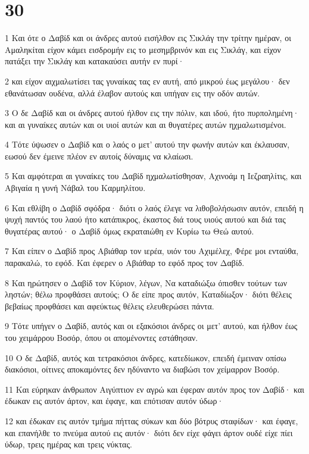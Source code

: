 \chapter{30}

\par 1 Και ότε ο Δαβίδ και οι άνδρες αυτού εισήλθον εις Σικλάγ την τρίτην ημέραν, οι Αμαληκίται είχον κάμει εισδρομήν εις το μεσημβρινόν και εις Σικλάγ, και είχον πατάξει την Σικλάγ και κατακαύσει αυτήν εν πυρί·
\par 2 και είχον αιχμαλωτίσει τας γυναίκας τας εν αυτή, από μικρού έως μεγάλου· δεν εθανάτωσαν ουδένα, αλλά έλαβον αυτούς και υπήγαν εις την οδόν αυτών.
\par 3 Ο δε Δαβίδ και οι άνδρες αυτού ήλθον εις την πόλιν, και ιδού, ήτο πυρπολημένη· και αι γυναίκες αυτών και οι υιοί αυτών και αι θυγατέρες αυτών ηχμαλωτισμένοι.
\par 4 Τότε ύψωσεν ο Δαβίδ και ο λαός ο μετ' αυτού την φωνήν αυτών και έκλαυσαν, εωσού δεν έμεινε πλέον εν αυτοίς δύναμις να κλαίωσι.
\par 5 Και αμφότεραι αι γυναίκες του Δαβίδ ηχμαλωτίσθησαν, Αχινοάμ η Ιεζραηλίτις, και Αβιγαία η γυνή Νάβαλ του Καρμηλίτου.
\par 6 Και εθλίβη ο Δαβίδ σφόδρα· διότι ο λαός έλεγε να λιθοβολήσωσιν αυτόν, επειδή η ψυχή παντός του λαού ήτο κατάπικρος, έκαστος διά τους υιούς αυτού και διά τας θυγατέρας αυτού· ο Δαβίδ όμως εκραταιώθη εν Κυρίω τω Θεώ αυτού.
\par 7 Και είπεν ο Δαβίδ προς Αβιάθαρ τον ιερέα, υιόν του Αχιμέλεχ, Φέρε μοι ενταύθα, παρακαλώ, το εφόδ. Και έφερεν ο Αβιάθαρ το εφόδ προς τον Δαβίδ.
\par 8 Και ηρώτησεν ο Δαβίδ τον Κύριον, λέγων, Να καταδιώξω όπισθεν τούτων των ληστών; θέλω προφθάσει αυτούς; Ο δε είπε προς αυτόν, Καταδίωξον· διότι θέλεις βεβαίως προφθάσει και αφεύκτως θέλεις ελευθερώσει πάντα.
\par 9 Τότε υπήγεν ο Δαβίδ, αυτός και οι εξακόσιοι άνδρες οι μετ' αυτού, και ήλθον έως του χειμάρρου Βοσόρ, όπου οι απομένοντες εστάθησαν.
\par 10 Ο δε Δαβίδ, αυτός και τετρακόσιοι άνδρες, κατεδίωκον, επειδή έμειναν οπίσω διακόσιοι, οίτινες αποκαμόντες δεν ηδύναντο να διαβώσι τον χείμαρρον Βοσόρ.
\par 11 Και εύρηκαν άνθρωπον Αιγύπτιον εν αγρώ και έφεραν αυτόν προς τον Δαβίδ· και έδωκαν εις αυτόν άρτον, και έφαγε, και επότισαν αυτόν ύδωρ·
\par 12 και έδωκαν εις αυτόν τμήμα πήττας σύκων και δύο βότρυς σταφίδων· και έφαγε, και επανήλθε το πνεύμα αυτού εις αυτόν· διότι δεν είχε φάγει άρτον ουδέ είχε πίει ύδωρ, τρεις ημέρας και τρεις νύκτας.
